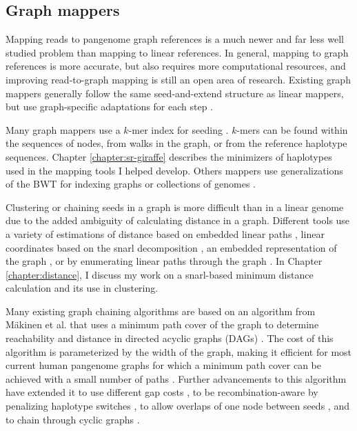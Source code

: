 \documentclass[11pt]{ucscthesis}
\begin{document}

\subsection{Graph mappers}
\label{sec:graph-mappers}

Mapping reads to pangenome graph references is a much newer and far less well studied problem than mapping to linear references.
In general, mapping to graph references is more accurate, but also requires more computational resources, and improving read-to-graph mapping is still an open area of research.
Existing graph mappers generally follow the same seed-and-extend structure as linear mappers, but use graph-specific adaptations for each step \cite{eizenga_pangenome_2020, baaijens_computational_2022}.

Many graph mappers use a $k$-mer index for seeding \cite{rautiainen_graphaligner_2020,rakocevic_fast_2019,vaddadi_vmap_2019,schneeberger_simultaneous_2009}.
$k$-mers can be found within the sequences of nodes, from walks in the graph, or from the reference haplotype sequences. 
Chapter \ref{chapter:sr-giraffe} describes the minimizers of haplotypes used in the mapping tools I helped develop.
Others mappers use generalizations of the BWT for indexing graphs \cite{garrison_vg_2018,kim_hisat2_2019,siren_indexing_2014,siren_indexes_2020} or collections of genomes \cite{rossi_moni_2022}.

Clustering or chaining seeds in a graph is more difficult than in a linear genome due to the added ambiguity of calculating distance in a graph.
Different tools use a variety of estimations of distance based on embedded linear paths \cite{garrison_vg_2018}, linear coordinates based on the snarl decomposition \cite{rautiainen_graphaligner_2020}, an embedded representation of the graph \cite{vaddadi_vmap_2019}, or by enumerating linear paths through the graph \cite{li_minigraph_2020}.
In Chapter \ref{chapter:distance}, I discuss my work on a snarl-based minimum distance calculation and its use in clustering. 

Many existing graph chaining algorithms are based on an algorithm from M{\"a}kinen et al. that uses a minimum path cover of the graph to determine reachability and distance in directed acyclic graphs (DAGs) \cite{makinen_dag_chaining_2019}.
The cost of this algorithm is parameterized by the width of the graph, making it efficient for most current human pangenome graphs for which a minimum path cover can be achieved with a small number of paths \cite{makinen_dag_chaining_2019}.
Further advancements to this algorithm have extended it to use different gap costs \cite{chandra_gap-sensitive_chaining_2023}, to be recombination-aware by penalizing haplotype switches \cite{chandra_haplotype-aware_2024}, to allow overlaps of one node between seeds \cite{ma_graphchainer_2023}, and to chain through cyclic graphs \cite{panaligner_2024}.
\end{document}
